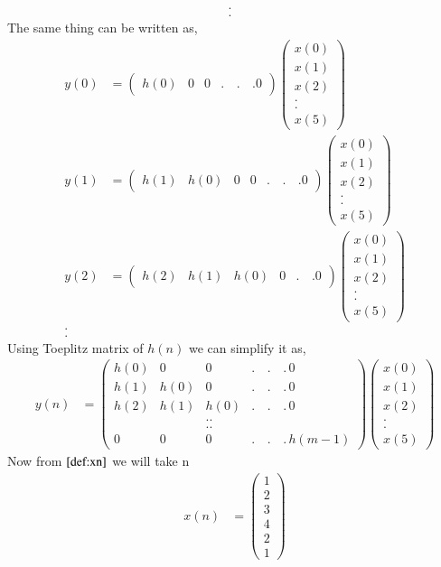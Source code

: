 \documentclass[journal,12pt,twocolumn]{IEEEtran}
\renewcommand\thesection{\arabic{section}}
\providecommand{\brak}[1]{\ensuremath{\left(#1\right)}}
\numberwithin{equation}{section}
\renewcommand\thesection{\arabic{section}}
\newcommand{\myvec}[1]{\ensuremath{\begin{pmatrix}#1\end{pmatrix}}}
\begin{document}
\begin{enumerate}[label=\thesection.\arabic*]
\begin{align}
      . \nonumber&\\ 
      .& \nonumber
     \end{align}
    The same thing can be written as,
     \begin{align}
       y\brak{0} &= \myvec{h\brak{0} & 0 & 0 &.\,&.\,&.0}\myvec{x\brak{0}\\x\brak{1}\\x\brak{2}\\ . \\.\\x\brak{5}}\\
       y\brak{1} &= \myvec{h\brak{1} & h\brak{0} & 0 & 0 &.\,&.\,&.0}\myvec{x\brak{0}\\x\brak{1}\\x\brak{2}\\ . \\.\\x\brak{5}}\\
       y\brak{2} &= \myvec{h\brak{2} & h\brak{1} & h\brak{0} & 0& .\,&.0}\myvec{x\brak{0}\\x\brak{1}\\x\brak{2}\\ . \\.\\x\brak{5}}\\
       . & \nonumber \\
       .& \nonumber
     \end{align}
    Using Toeplitz matrix of $h\brak{n}$ we can simplify it as,
     \begin{align}
       y\brak{n} &= \myvec{h\brak{0} & 0 & 0 &.\,&.\,&.\,0 \\
                           h\brak{1} & h\brak{0} & 0 & .\,&.\,&.\,0 \\
                           h\brak{2} & h\brak{1} & h\brak{0} & .\,&.\,&.\,0 \\
                            &&..\\&&..\\ 0 & 0 &  0 &.\,&.\,&.\, h\brak{m-1}}\myvec{x\brak{0}\\x\brak{1}\\x\brak{2}\\ . \\.\\x\brak{5}}\label{eq:ynconv_toep}
     \end{align}
     Now from $\eqref{def:xn}$ we will take n 
      \begin{align}
          x\brak{n} &= \myvec{1\\2\\3\\4\\2\\1}

\end{align}
\end{enumerate}
\end{document}
